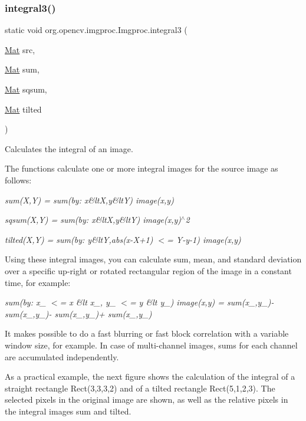 \subsubsection{\texorpdfstring{integral3()}{integral3()}\hspace{0.1cm}{\footnotesize\ttfamily [2/2]}}
{\footnotesize\ttfamily static void org.\+opencv.\+imgproc.\+Imgproc.\+integral3 (\begin{DoxyParamCaption}\item[{\mbox{\hyperlink{classorg_1_1opencv_1_1core_1_1_mat}{Mat}}}]{src,  }\item[{\mbox{\hyperlink{classorg_1_1opencv_1_1core_1_1_mat}{Mat}}}]{sum,  }\item[{\mbox{\hyperlink{classorg_1_1opencv_1_1core_1_1_mat}{Mat}}}]{sqsum,  }\item[{\mbox{\hyperlink{classorg_1_1opencv_1_1core_1_1_mat}{Mat}}}]{tilted }\end{DoxyParamCaption})\hspace{0.3cm}{\ttfamily [static]}}

Calculates the integral of an image.

The functions calculate one or more integral images for the source image as follows\+:

{\itshape sum(\+X,\+Y) = sum(by\+: x\&lt\+X,y\&lt\+Y) image(x,y)}

{\itshape sqsum(\+X,\+Y) = sum(by\+: x\&lt\+X,y\&lt\+Y) image(x,y)$^\wedge$2}

{\itshape tilted(\+X,\+Y) = sum(by\+: y\&ltY,abs(x-\/\+X+1) $<$= Y-\/y-\/1) image(x,y)}

Using these integral images, you can calculate sum, mean, and standard deviation over a specific up-\/right or rotated rectangular region of the image in a constant time, for example\+:

{\itshape sum(by\+: x\+\_ $<$= x \&lt x\+\_, y\+\_ $<$= y \&lt y\+\_) image(x,y) = sum(x\+\_,y\+\_)-\/ sum(x\+\_,y\+\_)-\/ sum(x\+\_,y\+\_)+ sum(x\+\_,y\+\_)}

It makes possible to do a fast blurring or fast block correlation with a variable window size, for example. In case of multi-\/channel images, sums for each channel are accumulated independently.

As a practical example, the next figure shows the calculation of the integral of a straight rectangle {\ttfamily Rect(3,3,3,2)} and of a tilted rectangle {\ttfamily Rect(5,1,2,3)}. The selected pixels in the original {\ttfamily image} are shown, as well as the relative pixels in the integral images {\ttfamily sum} and {\ttfamily tilted}.


